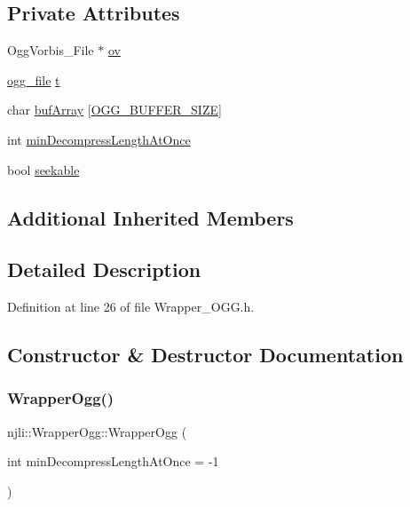 \subsection*{Private Attributes}
\begin{DoxyCompactItemize}
\item 
Ogg\+Vorbis\+\_\+\+File $\ast$ \mbox{\hyperlink{classnjli_1_1_wrapper_ogg_a295c445a708ee989fdc9e4baaf8aa998}{ov}}
\item 
\mbox{\hyperlink{structogg__file}{ogg\+\_\+file}} \mbox{\hyperlink{classnjli_1_1_wrapper_ogg_a38f58ccb93324aaf7aca3aa77c810efe}{t}}
\item 
char \mbox{\hyperlink{classnjli_1_1_wrapper_ogg_aa353b7ba5e112e1160689397d0a90de1}{buf\+Array}} \mbox{[}\mbox{\hyperlink{_wrapper___o_g_g_8h_a19906647bd966757e5f2acd00f34023d}{O\+G\+G\+\_\+\+B\+U\+F\+F\+E\+R\+\_\+\+S\+I\+ZE}}\mbox{]}
\item 
int \mbox{\hyperlink{classnjli_1_1_wrapper_ogg_ae96fb224e50879ef50c3021fa09ea890}{min\+Decompress\+Length\+At\+Once}}
\item 
bool \mbox{\hyperlink{classnjli_1_1_wrapper_ogg_a51417abb4c7c95e860b92a95146e7b2d}{seekable}}
\end{DoxyCompactItemize}
\subsection*{Additional Inherited Members}


\subsection{Detailed Description}


Definition at line 26 of file Wrapper\+\_\+\+O\+G\+G.\+h.



\subsection{Constructor \& Destructor Documentation}
\mbox{\label{classnjli_1_1_wrapper_ogg_a48f5522a7407346d58fa69c57ffbd369}} 
\subsubsection{\texorpdfstring{Wrapper\+Ogg()}{WrapperOgg()}}
{\footnotesize\ttfamily njli\+::\+Wrapper\+Ogg\+::\+Wrapper\+Ogg (\begin{DoxyParamCaption}\item[{int}]{min\+Decompress\+Length\+At\+Once = {\ttfamily -\/1} }\end{DoxyParamCaption})}

